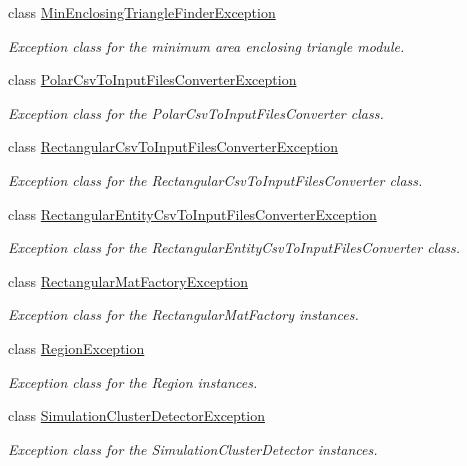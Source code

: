 \begin{DoxyCompactItemize}
class \hyperlink{classmultiscale_1_1MinEnclosingTriangleFinderException}{Min\-Enclosing\-Triangle\-Finder\-Exception}
\begin{DoxyCompactList}\small\item\em Exception class for the minimum area enclosing triangle module. \end{DoxyCompactList}\item 
class \hyperlink{classmultiscale_1_1PolarCsvToInputFilesConverterException}{Polar\-Csv\-To\-Input\-Files\-Converter\-Exception}
\begin{DoxyCompactList}\small\item\em Exception class for the Polar\-Csv\-To\-Input\-Files\-Converter class. \end{DoxyCompactList}\item 
class \hyperlink{classmultiscale_1_1RectangularCsvToInputFilesConverterException}{Rectangular\-Csv\-To\-Input\-Files\-Converter\-Exception}
\begin{DoxyCompactList}\small\item\em Exception class for the Rectangular\-Csv\-To\-Input\-Files\-Converter class. \end{DoxyCompactList}\item 
class \hyperlink{classmultiscale_1_1RectangularEntityCsvToInputFilesConverterException}{Rectangular\-Entity\-Csv\-To\-Input\-Files\-Converter\-Exception}
\begin{DoxyCompactList}\small\item\em Exception class for the Rectangular\-Entity\-Csv\-To\-Input\-Files\-Converter class. \end{DoxyCompactList}\item 
class \hyperlink{classmultiscale_1_1RectangularMatFactoryException}{Rectangular\-Mat\-Factory\-Exception}
\begin{DoxyCompactList}\small\item\em Exception class for the Rectangular\-Mat\-Factory instances. \end{DoxyCompactList}\item 
class \hyperlink{classmultiscale_1_1RegionException}{Region\-Exception}
\begin{DoxyCompactList}\small\item\em Exception class for the Region instances. \end{DoxyCompactList}\item 
class \hyperlink{classmultiscale_1_1SimulationClusterDetectorException}{Simulation\-Cluster\-Detector\-Exception}
\begin{DoxyCompactList}\small\item\em Exception class for the Simulation\-Cluster\-Detector instances. \end{DoxyCompactList}\item 

\end{DoxyCompactItemize}
